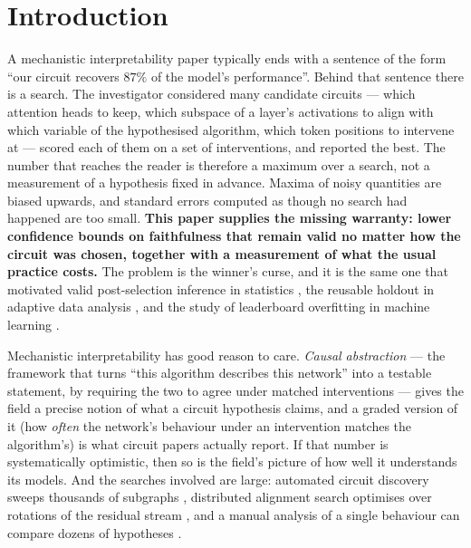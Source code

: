 \section{Introduction}
\label{sec:intro}

A mechanistic interpretability paper typically ends with a sentence of the form
``our circuit recovers $87\%$ of the model's performance''. Behind that sentence
there is a search. The investigator considered many candidate circuits --- which
attention heads to keep, which subspace of a layer's activations to align with
which variable of the hypothesised algorithm, which token positions to intervene
at --- scored each of them on a set of interventions, and reported the best. The
number that reaches the reader is therefore a maximum over a search, not a
measurement of a hypothesis fixed in advance. Maxima of noisy quantities are
biased upwards, and standard errors computed as though no search had happened are
too small. \textbf{This paper supplies the missing warranty: lower confidence
bounds on faithfulness that remain valid no matter how the circuit was chosen,
together with a measurement of what the usual practice costs.} The problem is the
winner's curse, and it is the same one that motivated valid post-selection
inference in statistics \citep{berk2013valid,lee2016exact}, the reusable holdout
in adaptive data analysis \citep{dwork2015reusable}, and the study of leaderboard
overfitting in machine learning
\citep{blum2015ladder,recht2019imagenet,roelofs2019metaanalysis}.

Mechanistic interpretability has good reason to care. \emph{Causal abstraction}
\citep{geiger2025causalabstraction} --- the framework that turns ``this algorithm
describes this network'' into a testable statement, by requiring the two to agree
under matched interventions --- gives the field a precise notion of what a circuit
hypothesis claims, and a graded version of it (how \emph{often} the network's
behaviour under an intervention matches the algorithm's) is what circuit papers
actually report. If that
number is systematically optimistic, then so is the field's picture of how well
it understands its models. And the searches involved are large: automated circuit
discovery sweeps thousands of subgraphs \citep{conmy2023towards,syed2024attribution},
distributed alignment search optimises over rotations of the residual stream
\citep{geiger2024finding}, and a manual analysis of a single behaviour can
compare dozens of hypotheses \citep{wang2023interpretability}.

